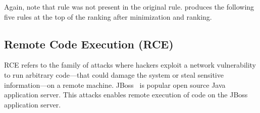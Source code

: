 \documentclass[sigconf,review, anonymous]{acmart}
\begin{document}
\begin{figure}[h]
  \vspace{-2ex}
  
  \vspace{-3ex}  
\end{figure}


Again, note that rule  was not present in the original
rule.  \tname{} produces the following five rules at the top of the
ranking after minimization and ranking.

\begin{figure}[h]
  \vspace{-2ex}
  
  \vspace{-3ex}  
\end{figure}



\subsection{Remote Code Execution (RCE)}
\label{sec:rce}
\label{sec:jboss}
\label{sec:content-example}


RCE refers to the family of attacks where hackers exploit a network
vulnerability to run arbitrary code---that could damage the system or
steal sensitive information---on a remote machine. JBoss~\cite{jboss}
is popular open source Java application server. This attacks enables
remote execution of code on the JBoss application server.

\end{document}
